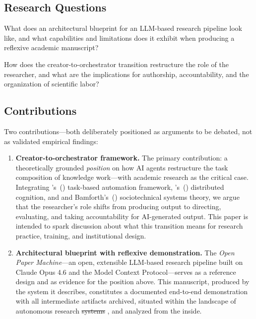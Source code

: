 \documentclass{article}
\providecommand{\DIFaddtex}[1]{{\protect\color{blue}\uwave{#1}}} %
\providecommand{\DIFdeltex}[1]{{\protect\color{red}\sout{#1}}}                      %
\providecommand{\DIFaddbegin}{} %
\providecommand{\DIFaddend}{} %
\providecommand{\DIFdelbegin}{} %
\providecommand{\DIFdelend}{} %
\providecommand{\DIFadd}[1]{\texorpdfstring{\DIFaddtex{#1}}{#1}} %
\providecommand{\DIFdel}[1]{\texorpdfstring{\DIFdeltex{#1}}{}} %
\newcommand{\DIFscaledelfig}{0.5}
\newlength{\DIFdelgraphicswidth} %
\newlength{\DIFdelgraphicsheight} %
\newcommand{\DIFaddincludegraphics}[2][]{{\color{blue}\fbox{\DIFOincludegraphics[#1]{#2}}}} %
\newcommand{\DIFdelincludegraphics}[2][]{%
\sbox{\DIFdelgraphicsbox}{\DIFOincludegraphics[#1]{#2}}%
\settoboxwidth{\DIFdelgraphicswidth}{\DIFdelgraphicsbox} %
\settoboxtotalheight{\DIFdelgraphicsheight}{\DIFdelgraphicsbox} %
\scalebox{\DIFscaledelfig}{%
\parbox[b]{\DIFdelgraphicswidth}{\usebox{\DIFdelgraphicsbox}\\[-\baselineskip] \rule{\DIFdelgraphicswidth}{0em}}\llap{\resizebox{\DIFdelgraphicswidth}{\DIFdelgraphicsheight}{%
\setlength{\unitlength}{\DIFdelgraphicswidth}%
\begin{picture}(1,1)%
\thicklines\linethickness{2pt} %
{\color[rgb]{1,0,0}\put(0,0){\framebox(1,1){}}}%
{\color[rgb]{1,0,0}\put(0,0){\line( 1,1){1}}}%
{\color[rgb]{1,0,0}\put(0,1){\line(1,-1){1}}}%
\end{picture}%
}\hspace*{3pt}}} %
} %
\DeclareRobustCommand{\DIFaddbegin}{\DIFOaddbegin \let\includegraphics\DIFaddincludegraphics} %
\DeclareRobustCommand{\DIFaddend}{\DIFOaddend \let\includegraphics\DIFOincludegraphics} %
\DeclareRobustCommand{\DIFdelbegin}{\DIFOdelbegin \let\includegraphics\DIFdelincludegraphics} %
\DeclareRobustCommand{\DIFdelend}{\DIFOaddend \let\includegraphics\DIFOincludegraphics} %
\begin{document}
\subsection{Research Questions}

\begin{description}[style=nextline, leftmargin=1em]
  \item[\textbf{RQ1.}] What does an architectural blueprint for an LLM-based research pipeline look like, and what capabilities and limitations does it exhibit when producing a reflexive academic manuscript?
  \item[\textbf{RQ2.}] How does the creator-to-orchestrator transition restructure the role of the researcher, and what are the implications for authorship, accountability, and the organization of scientific labor?
\end{description}

\subsection{Contributions}

Two contributions---both deliberately positioned as arguments to be debated, not as validated empirical findings:

\begin{enumerate}
  \item \textbf{Creator-to-orchestrator framework.} The primary contribution: a theoretically grounded \textit{position} on how AI agents restructure the task composition of knowledge work---with academic research as the critical case. Integrating \citeauthor{autor2015why}'s~(\citeyear{autor2015why}) task-based automation framework, \citeauthor{hutchins1995cognition}'s~(\citeyear{hutchins1995cognition}) distributed cognition, and \citeauthor{trist1951social} and Bamforth's~(\citeyear{trist1951social}) sociotechnical systems theory, we argue that the researcher's role shifts from producing output to directing, evaluating, and taking accountability for AI-generated output. This paper is intended to spark discussion about what this transition means for research practice, training, and institutional design.
  \item \textbf{Architectural blueprint with reflexive demonstration.} The \textit{Open Paper Machine}---an open, extensible LLM-based research pipeline built on Claude Opus 4.6 and the Model Context Protocol---serves as a reference design and as evidence for the position above. This manuscript, produced by the system it describes, constitutes a documented end-to-end demonstration with all intermediate artifacts archived, situated within the landscape of autonomous research \DIFdelbegin \DIFdel{systems }\DIFdelend \DIFaddbegin \DIFadd{agents }\DIFaddend \citep{handler2023taxonomy,wang2024survey}, and analyzed from the inside.
\end{enumerate}
\end{document}
